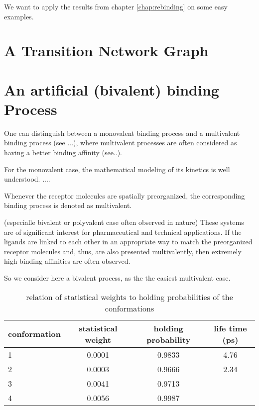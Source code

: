 We want to apply the results from chapter \ref{chap:rebinding} on some easy examples.

\section{A Transition Network Graph}

\section{An artificial (bivalent) binding Process}

One can distinguish between a monovalent binding process and a multivalent binding process (see ...), where multivalent processes are often considered as having a better binding affinity (see..).

For the monovalent case, the mathematical modeling of its kinetics is well understood.
....

Whenever the receptor molecules are spatially preorganized, the corresponding binding process is denoted as multivalent.

(especialle bivalent or polyvalent case often observed in nature)
These systems are of significant interest for pharmaceutical and technical applications. If the ligands are linked to each other in an appropriate way to match the preorganized receptor molecules and, thus, are also presented multivalently, then extremely high binding affinities are often observed.

So we consider here a bivalent process, as the the easiest multivalent case.

\begin{table}[ht]
\begin{tabular}{lccc}
\toprule
conformation              & statistical weight & holding probability & life time (ps) \\
\midrule
1    & 0.0001   & 0.9833 & 4.76   \\
2     & 0.0003  & 0.9666 & 2.34  \\
3     & 0.0041  & 0.9713 &    \\
4     & 0.0056 & 0.9987 &   \\
\bottomrule
\end{tabular}
\caption{relation of statistical weights to holding probabilities of the conformations}
\end{table}